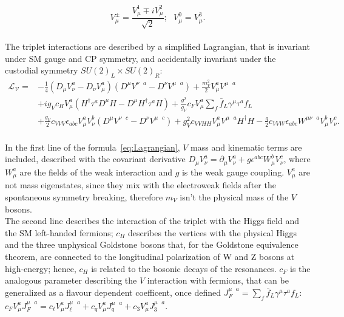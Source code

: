 \begin{equation}
V_{\mu}^{\pm} = \frac{V_{\mu}^1 \mp i V_{\mu}^2}{\sqrt{2}}; \mbox{ } V_{\mu}^0 = V_{\mu}^3.
\label{eq:V_triplet}
\end{equation}
\\
The triplet interactions are described by a simplified Lagrangian, that is invariant under SM gauge and CP symmetry, and accidentally invariant under the custodial symmetry $SU(2)_L \times SU(2)_R$:
\begin{equation}
\begin{split}
\mathcal{L_V} ={} & -\frac{1}{4} \left(D_{\mu}V_{\nu}^a - D_{\nu}V_{\mu}^a \right) \left( D^{\mu}V^{\nu \mbox{ } a} - D^{\nu}V^{\mu \mbox{ } a} \right) + \frac{m_V^2}{2}V_{\mu}^aV^{\mu \mbox{ } a} \\
 & +i g_V c_H V_{\mu}^a \left( H^{\dagger} \tau^a D^{\mu}H - D^{\mu}H^{\dagger} \tau^a H \right) + \frac{g^2}{g_V}c_F V_{\mu}^a \sum_{f} \bar{f}_L \gamma^{\mu} \tau^a f_L \\
 & + \frac{g_V}{2} c_{VVV} \epsilon_{abc} V_{\mu}^a V_{\nu}^b \left( D^{\mu}V^{\nu \mbox{ } c} - D^{\nu}V^{\mu \mbox{ } c}\right) + g_V^2 c_{VVHH} V_{\mu}^a V^{\mu \mbox{ } a} H^{\dagger} H - \frac{g}{2} c_{VVW} \epsilon_{abc} W^{\mu \nu \mbox{ } a} V_{\mu}^b V_{\nu}^c.
\end{split}
\label{eq:Lagrangian}
\end{equation}
\\
In the first line of the formula~\ref{eq:Lagrangian}, $V$ mass and kinematic terms are included, described with the covariant derivative $D_{\mu} V_{\nu}^a = \partial_{\mu} V_{\nu}^a + g \epsilon^{abc} W_{\mu}^b V_{\nu}^c$, where $W_{\mu}^a$ are the fields of the weak interaction and $g$ is the weak gauge coupling. $V_{\mu}^a$ are not mass eigenstates, since they mix with the electroweak fields after the spontaneous symmetry breaking, therefore $m_V$ isn't the physical mass of the $V$ bosons.\\
The second line describes the interaction of the triplet with the Higgs field and the SM left-handed fermions; $c_H$ describes the vertices with the physical Higgs and the three unphysical Goldstone bosons that, for the Goldstone equivalence theorem, are connected to the longitudinal polarization of W and Z bosons at high-energy; hence, $c_H$ is related to the bosonic decays of the resonances. $c_F$ is the analogous parameter describing the $V$ interaction with fermions, that can be generalized as a flavour dependent coefficent, once defined $J_F^{\mu \mbox{ } a} = \sum_{f} \bar{f}_L \gamma^{\mu} \tau^a f_L$: $c_F V_{\mu}^a  J_F^{\mu \mbox{ } a} = c_{\ell} V_{\mu}^a  J_{\ell}^{\mu \mbox{ } a} + c_{q} V_{\mu}^a  J_{q}^{\mu \mbox{ } a} + c_{3} V_{\mu}^a  J_{3}^{\mu \mbox{ } a}$.\\
